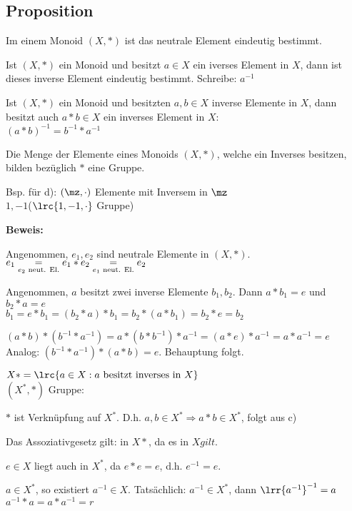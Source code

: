 	\subsection{Proposition}

		\item Im einem Monoid $(X,*)$ ist das neutrale Element eindeutig bestimmt.
		\item Ist $(X,*)$ ein Monoid und besitzt $a\in X$ ein iverses Element in $X$, dann ist dieses inverse Element eindeutig bestimmt. Schreibe: $a^{-1}$
		\item Ist $(X,*)$ ein Monoid und besitzten $a,b\in X$ inverse Elemente in $X$, dann besitzt auch $a*b\in X$ ein inverses Element in $X$:\\
		$(a*b)^{-1}=b^{-1}*a^{-1}$
		\item Die Menge der Elemente eines Monoids $(X,*)$, welche ein Inverses besitzen, bilden bezüglich $*$ eine Gruppe.
	\subExEnd

	Bsp. für d): $(\mz,\cdot)$ Elemente mit Inversem in $\mz$\\
	$1,-1$\quad ($\lrc{1,-1,\cdot}$ Gruppe)

	\textbf{Beweis:}
		\item Angenommen, $e_1,e_2$ sind neutrale Elemente in $(X,*)$.$e_1\underset{e_2\mbox{\scriptsize\ neut. El.}}{=}e_1*e_2\underset{e_1\mbox{\scriptsize\ neut. El.}}=e_2$
		\item Angenommen, $a$ besitzt zwei inverse Elemente $b_1, b_2$. Dann $a*b_1=e$ und $b_2*a=e$\\
		$b_1=e*b_1=(b_2*a)*b_1=b_2*(a*b_1)=b_2*e=b_2$
		\item $(a*b)*(b^{-1}*a^{-1})=a*(b*b^{-1})*a^{-1}=(a*e)*a^{-1}=a*a^{-1}=e$\\
		Analog: $(b^{-1}*a^{-1})*(a*b)=e$. Behauptung folgt.
		\item $X*=\lrc{a\in X: a\mbox{ besitzt inverses in }X}$\\
		$(X^*,*)$ Gruppe:
			\item $*$ ist Verknüpfung auf $X^*$. D.h. $a,b\in X^*\Rightarrow a*b\in X^*$, folgt aus c)
			\item Das Assoziativgesetz gilt: in $X*$, da es in $X gilt$.
			\item $e\in X$ liegt auch in $X^*$, da $e*e=e$, d.h. $e^{-1}=e$.
			\item $a\in X^*$, so existiert $a^{-1}\in X$. Tatsächlich: $a^{-1}\in X^*$, dann $\lrr{a^{-1}}^{-1}=a$\\
			$a^{-1}*a=a*a^{-1}=r$
		\subExEnd
	\subExEnd

